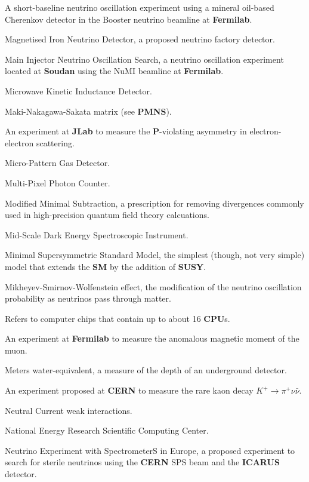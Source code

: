  A short-baseline neutrino oscillation experiment using
a mineral oil-based Cherenkov detector in the Booster neutrino beamline at
{\bf Fermilab}.  

 Magnetised Iron Neutrino Detector, a proposed
neutrino factory detector.

 Main Injector Neutrino Oscillation Search, a neutrino
oscillation experiment located at {\bf Soudan} using the NuMI beamline at
{\bf Fermilab}.

 Microwave Kinetic Inductance Detector.

 Maki-Nakagawa-Sakata matrix (see {\bf PMNS}).

  An experiment at {\bf JLab} to measure the {\bf
  P}-violating asymmetry in electron-electron scattering.

 Micro-Pattern Gas Detector.

 Multi-Pixel Photon Counter.

 Modified Minimal Subtraction, a prescription for
removing divergences commonly used in high-precision quantum field theory
calcuations.

 Mid-Scale Dark Energy Spectroscopic Instrument.

 Minimal Supersymmetric Standard Model, the simplest
(though, not very simple) model that extends the {\bf SM} by the addition of 
{\bf SUSY}. 

 Mikheyev-Smirnov-Wolfenstein effect, the modification of the
neutrino oscillation probability as neutrinos pass through matter.

  Refers to computer chips that contain up to
about 16 {\bf CPU}s.

  An experiment at {\bf Fermilab} to 
 measure the anomalous magnetic moment of the muon.

 Meters water-equivalent, a measure of the depth of an
underground detector.

   An experiment proposed at {\bf CERN} to measure
 the rare kaon decay $K^+ \to \pi^+ \nu \bar \nu$. 

 Neutral Current weak interactions.

  National Energy Research Scientific Computing Center.

 Neutrino Experiment with SpectrometerS in Europe,
a proposed experiment to search for sterile neutrinos using the {\bf CERN}
SPS beam and the {\bf ICARUS} detector.

